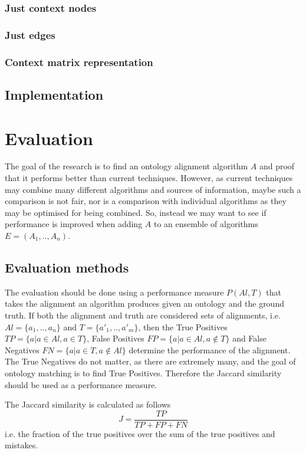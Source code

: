 \documentclass{article}
\begin{document}
  \subsubsection{Just context nodes}
  
  \subsubsection{Just edges}
  
  \subsubsection{Context matrix representation}
  
 \subsection{Implementation}
 
 
 \section{Evaluation}
 The goal of the research is to find an ontology alignment algorithm $A$ and proof that it performs better than current techniques. However, as current techniques may combine many different algorithms and sources of information, maybe such a comparison is not fair, nor is a comparison with individual algorithms as they may be optimised for being combined. So, instead we may want to see if performance is improved when adding $A$ to an ensemble of algorithms $E=(A_1,..,A_n)$.
 \subsection{Evaluation methods}
 The evaluation should be done using a performance measure $P(Al,T)$ that takes the alignment an algorithm produces given an ontology and the ground truth. If both the alignment and truth are considered sets of alignments, i.e. $Al=\{a_1,..,a_n\}$ and $T=\{a'_1,..,a'_m\}$, then the True Positives $TP=\{a|a\in Al, a\in T\}$, False Positives $FP=\{a|a\in Al, a\notin T\}$ and False Negatives $FN=\{a|a\in T, a\notin Al\}$ determine the performance of the alignment. The True Negatives do not matter, as there are extremely many, and the goal of ontology matching is to find True Positives. Therefore the Jaccard similarity should be used as a performance measure.
 
 The Jaccard similarity is calculated as follows
 \[
 J = \frac{TP}{TP + FP + FN}
 \]
 i.e. the fraction of the true positives over the sum of the true positives and mistakes.
 
\end{document}
